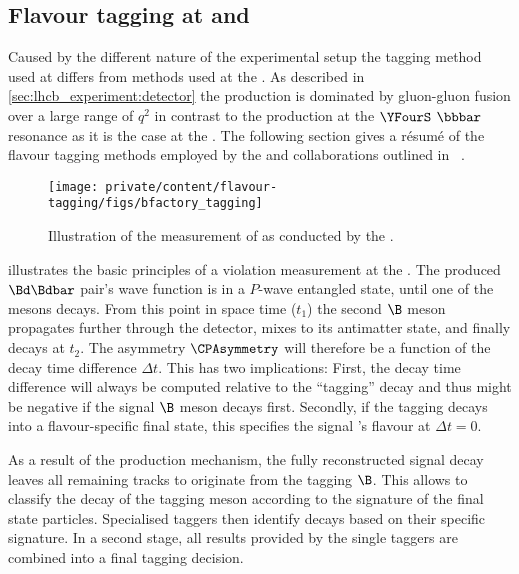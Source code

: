 \subsection{Flavour tagging at \Babar and \Belle}
\label{sec:flavour_tagging:lhcb:b_factories}

Caused by the different nature of the experimental setup the tagging method used
at \LHCb differs from methods used at the \BFactories. As described in
\cref{sec:lhcb_experiment:detector} the \bhadron production is dominated
by gluon-gluon fusion over a large range of $q^2$ in contrast to the production
at the $\YFourS$ $\bbbar$ resonance as it is the case at the \BFactories. The
following section gives a résumé of the flavour tagging methods employed by the
\Babar and \Belle collaborations outlined in \Ref~\cite[][Ch. 8]{Bevan:2014iga}.
%
\begin{figure}[h]
\centering
\texttt{[image: private/content/flavour-tagging/figs/bfactory\_tagging]}
\caption{Illustration of the measurement of \sintwobeta as conducted by the \BFactories.
}
\label{fig:flavour_tagging:lhcb:b_factory_basic_principles}
\end{figure}

 illustrates the basic
principles of a \CP violation measurement at the \BFactories. The produced
$\Bd\Bdbar$ pair's wave function is in a $P$-wave entangled state, until one of
the mesons decays. From this point in space time ($t_1$) the second $\B$ meson
propagates further through the detector, mixes to its antimatter state, and
finally decays at $t_2$. The \CP asymmetry $\CPAsymmetry$ will therefore be a
function of the decay time difference $\Delta t$. This has two implications:
First, the decay time difference will always be computed relative to the
\enquote{tagging} \Bmeson decay and thus might be negative if the signal $\B$
meson decays first. Secondly, if the tagging \Bmeson decays into a
flavour-specific final state, this specifies the signal \Bmeson's flavour at
$\Delta t=0$.

As a result of the production mechanism, the fully reconstructed signal decay
leaves all remaining tracks to originate from the tagging $\B$. This allows to
classify the decay of the tagging meson according to the signature of the final
state particles. Specialised taggers then identify decays based on their
specific signature. In a second stage, all results provided by the single
taggers are combined into a final tagging decision. 

